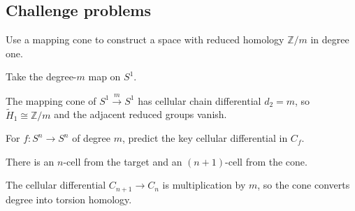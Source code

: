 \subsection*{Challenge problems}

\begin{exercise}\label{exr:viii07-ped-15}
Use a mapping cone to construct a space with reduced homology $\mathbb Z/m$ in degree one.
\end{exercise}
\begin{hint}
Take the degree-$m$ map on $S^1$.
\end{hint}
\begin{solution}
The mapping cone of $S^1\xrightarrow{m}S^1$ has cellular chain differential $d_2=m$, so $\widetilde H_1\cong\mathbb Z/m$ and the adjacent reduced groups vanish.
\end{solution}

\begin{exercise}\label{exr:viii07-ped-16}
For $f:S^n\to S^n$ of degree $m$, predict the key cellular differential in $C_f$.
\end{exercise}
\begin{hint}
There is an $n$-cell from the target and an $(n+1)$-cell from the cone.
\end{hint}
\begin{solution}
The cellular differential $C_{n+1}\to C_n$ is multiplication by $m$, so the cone converts degree into torsion homology.
\end{solution}

